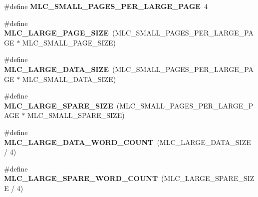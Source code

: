\begin{DoxyCompactItemize}
\#define {\bfseries M\+L\+C\+\_\+\+S\+M\+A\+L\+L\+\_\+\+P\+A\+G\+E\+S\+\_\+\+P\+E\+R\+\_\+\+L\+A\+R\+G\+E\+\_\+\+P\+A\+GE}~4
\item 
\mbox{\label{group__lpc32xx__nand__mlc_ga550139d0474fc4d3c9d1f9c5c588b13d}} 
\#define {\bfseries M\+L\+C\+\_\+\+L\+A\+R\+G\+E\+\_\+\+P\+A\+G\+E\+\_\+\+S\+I\+ZE}~(M\+L\+C\+\_\+\+S\+M\+A\+L\+L\+\_\+\+P\+A\+G\+E\+S\+\_\+\+P\+E\+R\+\_\+\+L\+A\+R\+G\+E\+\_\+\+P\+A\+GE $\ast$ M\+L\+C\+\_\+\+S\+M\+A\+L\+L\+\_\+\+P\+A\+G\+E\+\_\+\+S\+I\+ZE)
\item 
\mbox{\label{group__lpc32xx__nand__mlc_ga1c8d40a5938d89b5ad1b54d8de64eae6}} 
\#define {\bfseries M\+L\+C\+\_\+\+L\+A\+R\+G\+E\+\_\+\+D\+A\+T\+A\+\_\+\+S\+I\+ZE}~(M\+L\+C\+\_\+\+S\+M\+A\+L\+L\+\_\+\+P\+A\+G\+E\+S\+\_\+\+P\+E\+R\+\_\+\+L\+A\+R\+G\+E\+\_\+\+P\+A\+GE $\ast$ M\+L\+C\+\_\+\+S\+M\+A\+L\+L\+\_\+\+D\+A\+T\+A\+\_\+\+S\+I\+ZE)
\item 
\mbox{\label{group__lpc32xx__nand__mlc_ga531203d78a950374f0921e7ac2c844b5}} 
\#define {\bfseries M\+L\+C\+\_\+\+L\+A\+R\+G\+E\+\_\+\+S\+P\+A\+R\+E\+\_\+\+S\+I\+ZE}~(M\+L\+C\+\_\+\+S\+M\+A\+L\+L\+\_\+\+P\+A\+G\+E\+S\+\_\+\+P\+E\+R\+\_\+\+L\+A\+R\+G\+E\+\_\+\+P\+A\+GE $\ast$ M\+L\+C\+\_\+\+S\+M\+A\+L\+L\+\_\+\+S\+P\+A\+R\+E\+\_\+\+S\+I\+ZE)
\item 
\mbox{\label{group__lpc32xx__nand__mlc_gad0c24d9f0ec687ae37dcb3093393ad0e}} 
\#define {\bfseries M\+L\+C\+\_\+\+L\+A\+R\+G\+E\+\_\+\+D\+A\+T\+A\+\_\+\+W\+O\+R\+D\+\_\+\+C\+O\+U\+NT}~(M\+L\+C\+\_\+\+L\+A\+R\+G\+E\+\_\+\+D\+A\+T\+A\+\_\+\+S\+I\+ZE / 4)
\item 
\mbox{\label{group__lpc32xx__nand__mlc_ga33d0e5ca3d25e155b0fab11c7932da99}} 
\#define {\bfseries M\+L\+C\+\_\+\+L\+A\+R\+G\+E\+\_\+\+S\+P\+A\+R\+E\+\_\+\+W\+O\+R\+D\+\_\+\+C\+O\+U\+NT}~(M\+L\+C\+\_\+\+L\+A\+R\+G\+E\+\_\+\+S\+P\+A\+R\+E\+\_\+\+S\+I\+ZE / 4)
\end{DoxyCompactItemize}
